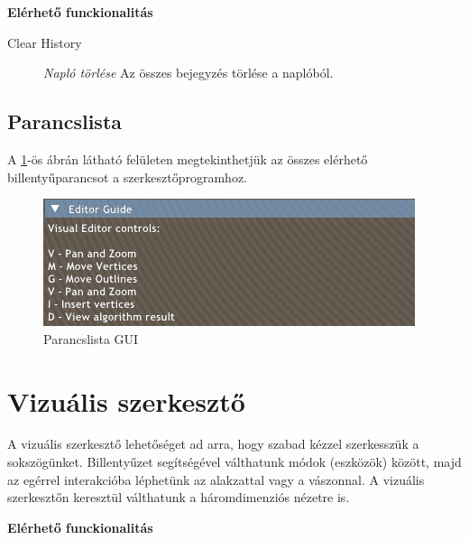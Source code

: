 \textbf{Elérhető funckionalitás}

\begin{description}
    \item[Clear History] \textit{Napló törlése} Az összes bejegyzés törlése a naplóból.
\end{description}

\subsection{Parancslista}

A \ref{fig:user_guide-1}-ös ábrán látható felületen megtekinthetjük az összes elérhető billentyűparancsot a szerkesztőprogramhoz.

\begin{figure}[H]
    \centering
    \includegraphics[width=1\linewidth]{images/user_guide.png}
    \caption{Parancslista GUI}
    \label{fig:user_guide-1}
\end{figure}


\section{Vizuális szerkesztő}\label{sec:visual_editor}

A vizuális szerkesztő lehetőséget ad arra, hogy szabad kézzel szerkesszük a sokszögünket. Billentyűzet segítségével válthatunk módok (eszközök) között, majd az egérrel interakcióba léphetünk az alakzattal vagy a vászonnal. A vizuális szerkesztőn keresztül válthatunk a háromdimenziós nézetre is.

\textbf{Elérhető funckionalitás}

